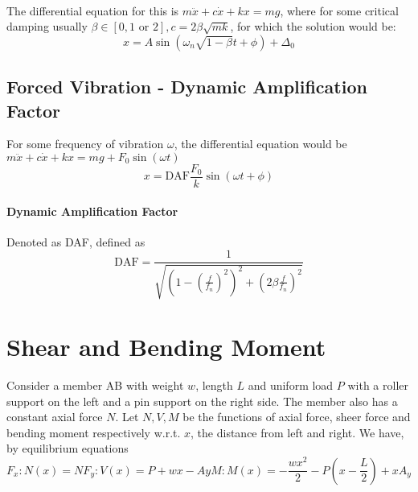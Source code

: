 \paragraph{} The differential equation for this is $m\ddot{x} + c\dot{x} + kx = mg$, where for some critical damping usually $\beta \in [0, 1 \text{ or } 2], c = 2\beta\sqrt{mk}$, for which the solution would be:
\begin{equation}
    x= A\sin{(\omega_n\sqrt{1-\beta}t + \phi)} + \Delta_0
\end{equation}
\subsection{Forced Vibration - Dynamic Amplification Factor} For some frequency of vibration $\omega$, the differential equation would be $m\ddot{x} + c\dot{x} + kx = mg + F_0\sin(\omega t)$
\begin{equation}
    x = \text{DAF} \frac{F_0}{k}\sin{(\omega t + \phi)}
\end{equation}
\paragraph{Dynamic Amplification Factor} Denoted as DAF, defined as
\begin{equation}
    \text{DAF} = \frac{1}{\sqrt{(1-(\frac{f}{f_n})^2)^2+ (2\beta \frac{f}{f_n})^2}}
\end{equation}
\section{Shear and Bending Moment} Consider a member AB with weight $w$, length $L$ and uniform load $P$ with a roller support on the left and a pin support on the right side. The member also has a constant axial force $N$. Let $N, V, M$ be the functions of axial force, sheer force and bending moment respectively w.r.t. $x$, the distance from left and right. We have, by equilibrium equations
\begin{subequations}
    \begin{equation}
        F_x: N(x) = N
    \end{equation}
    \begin{equation}
        F_y: V(x) = P + wx - Ay
    \end{equation}
    \begin{equation}
        M: M(x) = -\frac{wx^2}{2} - P(x-\frac{L}{2}) + xA_y
    \end{equation}
\end{subequations}
